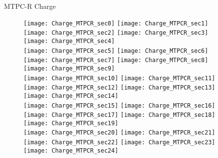 \documentclass[11pt]{beamer}
\begin{document}
\begin{frame}{MTPC-R Charge}
\begin{figure}
\texttt{[image: Charge\_MTPCR\_sec0]}
\texttt{[image: Charge\_MTPCR\_sec1]}
\texttt{[image: Charge\_MTPCR\_sec2]}
\texttt{[image: Charge\_MTPCR\_sec3]}
\texttt{[image: Charge\_MTPCR\_sec4]}\\
\texttt{[image: Charge\_MTPCR\_sec5]}
\texttt{[image: Charge\_MTPCR\_sec6]}
\texttt{[image: Charge\_MTPCR\_sec7]}
\texttt{[image: Charge\_MTPCR\_sec8]}
\texttt{[image: Charge\_MTPCR\_sec9]}\\
\texttt{[image: Charge\_MTPCR\_sec10]}
\texttt{[image: Charge\_MTPCR\_sec11]}
\texttt{[image: Charge\_MTPCR\_sec12]}
\texttt{[image: Charge\_MTPCR\_sec13]}
\texttt{[image: Charge\_MTPCR\_sec14]}\\
\texttt{[image: Charge\_MTPCR\_sec15]}
\texttt{[image: Charge\_MTPCR\_sec16]}
\texttt{[image: Charge\_MTPCR\_sec17]}
\texttt{[image: Charge\_MTPCR\_sec18]}
\texttt{[image: Charge\_MTPCR\_sec19]}\\
\texttt{[image: Charge\_MTPCR\_sec20]}
\texttt{[image: Charge\_MTPCR\_sec21]}
\texttt{[image: Charge\_MTPCR\_sec22]}
\texttt{[image: Charge\_MTPCR\_sec23]}
\texttt{[image: Charge\_MTPCR\_sec24]}
\end{figure}
\end{frame}



\end{document}
